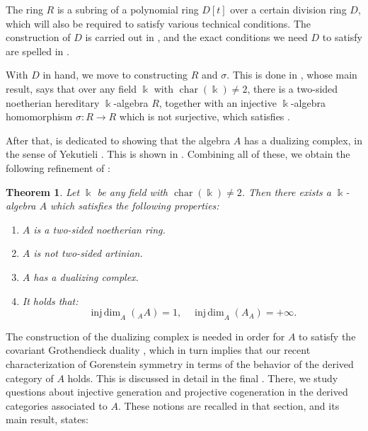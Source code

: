 \documentclass{amsart}
\newtheorem{cthm}{Theorem}
\theoremstyle{definition}
\newcommand{\opn}{\operatorname}
\renewcommand{\k}{\Bbbk}
\newcommand{\injdim}{\operatorname{inj\,dim}}
\numberwithin{equation}{section}
\begin{document}
The ring $R$ is a subring of a polynomial ring $D[t]$ over a certain division ring $D$, which will also be required to satisfy various technical conditions. The construction of $D$ is carried out in , and the exact conditions we need $D$ to satisfy are spelled in .

With $D$ in hand, we move to constructing $R$ and $\sigma$. 
This is done in , whose main result, 
says that over any field $\k$ with $\opn{char}(\k) \ne 2$,
there is a two-sided noetherian hereditary $\k$-algebra $R$,
together with an injective $\k$-algebra homomorphism $\sigma:R \to R$ which is not surjective, which satisfies .

After that,  is dedicated to showing that the algebra $A$ has a dualizing complex, in the sense of Yekutieli \cite{Yek}. This is shown in .
Combining all of these, we obtain the following refinement of :

\begin{cthm}
Let $\k$ be any field with $\opn{char}(\k) \ne 2$.
Then there exists a $\k$-algebra $A$ which satisfies the following properties:
\begin{enumerate}
\item $A$ is a two-sided noetherian ring.
\item $A$ is not two-sided artinian.
\item $A$ has a dualizing complex.
\item It holds that:
\[
\injdim_A( \phantom{ }_A A) = 1, \quad \injdim_A(A_A) = +\infty.
\]
\end{enumerate}
\end{cthm}

The construction of the dualizing complex is needed in order for $A$ to satisfy the covariant Grothendieck duality \cite{InKr,Neeflat},
which in turn implies that our recent characterization \cite{ShGor} of Gorenstein symmetry in terms of the behavior of the derived category of $A$ holds. This is discussed in detail in the final .
There, we study questions about injective generation and projective cogeneration in the derived categories associated to $A$.
These notions are recalled in that section, and its main result,
 states:
\end{document}
